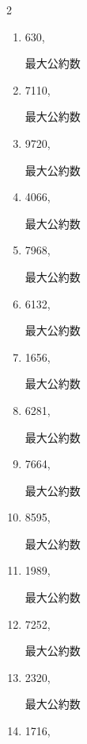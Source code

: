 \begin{multicols}{2}
\begin{enumerate}
        最大公約数

  \item 630,

        最大公約数

\columnbreak %

\resetques

  \item 7110,

        最大公約数

  \item 9720,

        最大公約数

  \item 4066,

        最大公約数

  \item 7968,

        最大公約数

  \item 6132,

        最大公約数

\columnbreak %

  \item 1656,

        最大公約数

  \item 6281,

        最大公約数

  \item 7664,

        最大公約数

  \item 8595,

        最大公約数

  \item 1989,

        最大公約数

\columnbreak %

\resetques

  \item 7252,

        最大公約数

  \item 2320,

        最大公約数

  \item 1716,


\end{enumerate}
\end{multicols}
